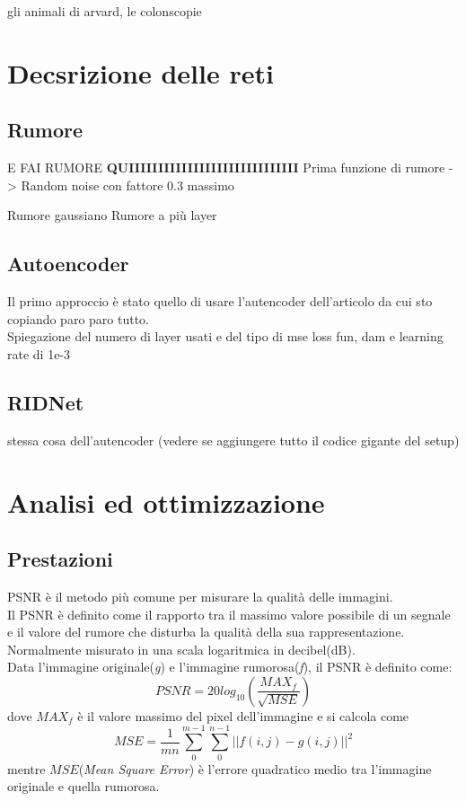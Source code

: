\documentclass[12pt,a4paper,openright,twoside]{book}
\newcommand{\TODOComment}[1]{}
\begin{document}
gli animali di arvard, le colonscopie \TODOComment{Approfondire aggiungendo link ai dataset e approfondire cose che non ci sono}

\chapter{Decsrizione delle reti}
\section{Rumore}
E FAI RUMORE \textbf{QUIIIIIIIIIIIIIIIIIIIIIIIIIIIII}
Prima funzione di rumore -> Random noise con fattore 0.3 massimo
\TODOComment{questi 2 più avanti}
Rumore gaussiano 
Rumore a più layer


\section{Autoencoder}
Il primo approccio è stato quello di usare l'autencoder dell'articolo da cui sto copiando paro paro tutto.\\
Spiegazione del numero di layer usati e del tipo di mse loss fun, dam e learning rate di 1e-3

\TODOComment{Modificare il dataset per i cosi successivi}

\section{RIDNet}
stessa cosa dell'autencoder (vedere se aggiungere tutto il codice gigante del setup)


\chapter{Analisi ed ottimizzazione}
\section{Prestazioni}
PSNR è il metodo più comune per misurare la qualità delle immagini.\\
Il PSNR è definito come il rapporto tra il massimo valore possibile di un segnale e il valore del rumore che disturba la qualità della sua rappresentazione.\\ Normalmente misurato in una scala logaritmica in decibel(dB).\\
Data l'immagine originale(\textit{g}) e l'immagine rumorosa(\textit{f}), il PSNR è definito come: \[PSNR=20log_{10}(\frac{MAX_f}{\sqrt{MSE}})\] dove $MAX_f$ è il valore massimo del pixel dell'immagine e si calcola come \[MSE=\frac{1}{mn}\sum_{0}^{m-1}\sum_{0}^{n-1}||f(i,j)-g(i,j)||^2  \] mentre $MSE$(\textit{Mean Square Error}) è l'errore quadratico medio tra l'immagine originale e quella rumorosa.\\
\TODOComment{Aggiungere codice del pnrr}
\end{document}
